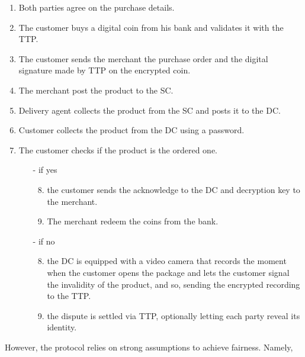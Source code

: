 \documentclass{ieeeaccess}
\begin{document}
\begin{enumerate}
    \item Both parties agree on the purchase details.
    \item The customer buys a digital coin from his bank and validates it with the TTP.
    \item The customer sends the merchant the purchase order and the digital signature made by TTP on the encrypted coin.
    \item The merchant post the product to the SC.
    \item Delivery agent collects the product from the SC and posts it to the DC.
    \item Customer collects the product from the DC using a password.
    \item The customer checks if the product is the ordered one.
    \begin{itemize}
    \item[-] if yes 
        \begin{enumerate}
        \setcounter{enumii}{7}
        \item the customer sends the acknowledge to the DC and decryption key to the merchant.
        \item The merchant redeem the coins from the bank.
        \end{enumerate}
    \item[-] if no
        \begin{enumerate}
        \setcounter{enumii}{7}
        \item the DC is equipped with a video camera that records the moment when the customer opens the package and lets the customer signal the invalidity of the product, and so, sending the encrypted recording to the TTP. 
        \item the dispute is settled via TTP, optionally letting each party reveal its identity.
    \end{enumerate}
    \end{itemize}
\end{enumerate}
\endgroup

However, the protocol relies on strong assumptions to achieve fairness.
Namely,
\end{document}
